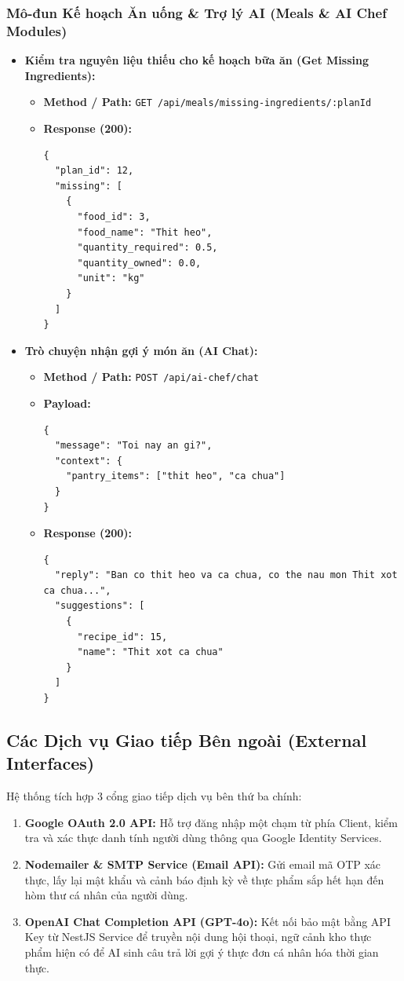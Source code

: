 \documentclass[../main.tex]{subfiles}
\begin{document}
\subsubsection{Mô-đun Kế hoạch Ăn uống \& Trợ lý AI (Meals \& AI Chef Modules)}
\begin{itemize}[leftmargin=*]
    \item \textbf{Kiểm tra nguyên liệu thiếu cho kế hoạch bữa ăn (Get Missing Ingredients):}
    \begin{itemize}
        \item \textbf{Method / Path:} \texttt{GET /api/meals/missing-ingredients/:planId}
        \item \textbf{Response (200):}
\begin{lstlisting}[style=jsonstyle]
{
  "plan_id": 12,
  "missing": [
    {
      "food_id": 3,
      "food_name": "Thit heo",
      "quantity_required": 0.5,
      "quantity_owned": 0.0,
      "unit": "kg"
    }
  ]
}
\end{lstlisting}
    \end{itemize}
    \item \textbf{Trò chuyện nhận gợi ý món ăn (AI Chat):}
    \begin{itemize}
        \item \textbf{Method / Path:} \texttt{POST /api/ai-chef/chat}
        \item \textbf{Payload:}
\begin{lstlisting}[style=jsonstyle]
{
  "message": "Toi nay an gi?",
  "context": {
    "pantry_items": ["thit heo", "ca chua"]
  }
}
\end{lstlisting}
        \item \textbf{Response (200):}
\begin{lstlisting}[style=jsonstyle]
{
  "reply": "Ban co thit heo va ca chua, co the nau mon Thit xot ca chua...",
  "suggestions": [
    {
      "recipe_id": 15,
      "name": "Thit xot ca chua"
    }
  ]
}
\end{lstlisting}
    \end{itemize}
\end{itemize}

\subsection{Các Dịch vụ Giao tiếp Bên ngoài (External Interfaces)}
Hệ thống tích hợp 3 cổng giao tiếp dịch vụ bên thứ ba chính:
\begin{enumerate}
    \item \textbf{Google OAuth 2.0 API:} Hỗ trợ đăng nhập một chạm từ phía Client, kiểm tra và xác thực danh tính người dùng thông qua Google Identity Services.
    \item \textbf{Nodemailer \& SMTP Service (Email API):} Gửi email mã OTP xác thực, lấy lại mật khẩu và cảnh báo định kỳ về thực phẩm sắp hết hạn đến hòm thư cá nhân của người dùng.
    \item \textbf{OpenAI Chat Completion API (GPT-4o):} Kết nối bảo mật bằng API Key từ NestJS Service để truyền nội dung hội thoại, ngữ cảnh kho thực phẩm hiện có để AI sinh câu trả lời gợi ý thực đơn cá nhân hóa thời gian thực.
\end{enumerate}
\end{document}
